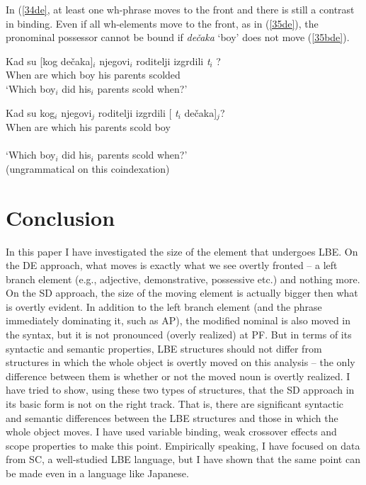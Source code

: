 \documentclass[
    output=paper,
    colorlinks,
    citecolor=brown,
]{langscibook}
\begin{document}
In (\ref{34de}, at least one wh-phrase moves to the front and there is still a contrast in binding. Even if all wh-elements move to the front, as in (\ref{35de}), the pronominal possessor cannot be bound if \textit{dečaka} ‘boy’ does not move (\ref{35bde}).

\begin{exe}
\ex \label{35de}
\begin{xlist}
\ex \label{35ade}
\gll Kad su [kog dečaka]$_{i}$ njegovi$_{i}$ roditelji izgrdili  \textit{t}$_{i}$  ?\\
When are which boy his parents scolded\\
‘Which boy$_{i}$ did his$_{i}$ parents scold when?’ 

\ex \label{35bde}
\gll *Kad su kog$_{i}$    njegovi$_{j}$ roditelji izgrdili [  \textit{t}$_{i}$ dečaka]$_{j}$?\\
When are which his parents scold {} {} boy\\\\
‘Which boy$_{i}$ did his$_{i}$ parents scold when?’\\
(ungrammatical on this coindexation)
\end{xlist}
\end{exe}

\section{Conclusion} \label{s4de}
In this paper I have investigated the size of the element that undergoes LBE. On the DE approach, what moves is exactly what we see overtly fronted – a left branch element (e.g., adjective, demonstrative, possessive etc.) and nothing more. On the SD approach, the size of the moving element is actually bigger then what is overtly evident. In addition to the left branch element (and the phrase immediately dominating it, such as AP), the modified nominal is also moved in the syntax, but it is not pronounced (overly realized) at PF. But in terms of its syntactic and semantic properties, LBE structures should not differ from structures in which the whole object is overtly moved on this analysis – the only difference between them is whether or not the moved noun is overtly realized. I have tried to show, using these two types of structures, that the SD approach in its basic form is not on the right track. That is, there are significant syntactic and semantic differences between the LBE structures and those in which the whole object moves.  I have used variable binding, weak crossover effects and scope properties to make this point. Empirically speaking, I have focused on data from SC, a well-studied LBE language, but I have shown that the same point can be made even in a language like Japanese. 
\end{document}
